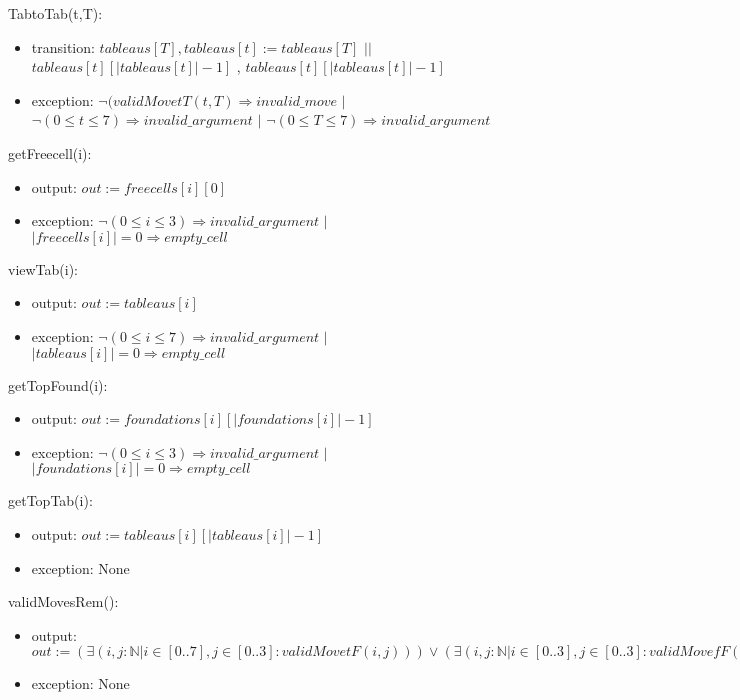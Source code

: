 \documentclass[12pt]{article}
\begin{document}
\noindent TabtoTab(t,T):
\begin{itemize}
\item transition: $tableaus[T], tableaus[t] :=  tableaus[T]$ $||$ $tableaus[t][|tableaus[t]|-1]$ , $tableaus[t][|tableaus[t]|-1]$
\item exception: $\neg(validMovetT(t,T) \Rightarrow invalid\_move$ $|$ $\neg( 0 \le t \le 7) \Rightarrow invalid\_argument$ $|$ $\neg( 0 \le T \le 7) \Rightarrow invalid\_argument$
\end{itemize}

\noindent getFreecell(i):
\begin{itemize}
\item output: $out := freecells[i][0]$
\item exception: $\neg( 0 \le i \le 3) \Rightarrow invalid\_argument$ $|$ $|freecells[i]| = 0 \Rightarrow empty\_cell$ 
\end{itemize}

\noindent viewTab(i):
\begin{itemize}
\item output: $out := tableaus[i]$
\item exception: $\neg( 0 \le i \le 7) \Rightarrow invalid\_argument$ $|$ $|tableaus[i]| = 0 \Rightarrow empty\_cell$ 
\end{itemize}

\noindent getTopFound(i):
\begin{itemize}
\item output: $out := foundations[i][|foundations[i]|-1]$
\item exception: $\neg( 0 \le i \le 3) \Rightarrow invalid\_argument$ $|$ $|foundations[i]| = 0 \Rightarrow empty\_cell$ 
\end{itemize}

\noindent getTopTab(i):
\begin{itemize}
\item output: $out := tableaus[i][|tableaus[i]|-1]$
\item exception: None 
\end{itemize}

\noindent validMovesRem():
\begin{itemize}
\item output: $out := (\exists(i,j:\mathbb{N} | i \in [0..7],j \in [0..3] : validMovetF(i,j))) \vee (\exists(i,j:\mathbb{N} | i \in [0..3],j \in [0..3] : validMovefF(i,j))) \vee (\exists(i,j:\mathbb{N} | i \in [0..3],j \in [0..7] : validMovefT(i,j))) \vee (\exists(i,j:\mathbb{N} | i \in [0..7],j \in [0..7] : validMovetT(i,j))) $
\item exception: None 
\end{itemize}
\end{document}
